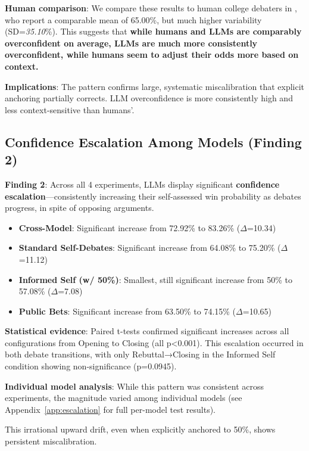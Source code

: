\documentclass{article}
\begin{document}
\textbf{Human comparison}: We compare these results to human college debaters in \citet{RePEc:sip:dpaper:06-042}, who report a comparable mean of 65.00\%, but much higher variability (SD=\textit{35.10}\%). This suggests that \textbf{while humans and LLMs are comparably overconfident on average, LLMs are much more consistently overconfident, while humans seem to adjust their odds more based on context.}

\textbf{Implications}: The pattern confirms large, systematic miscalibration that explicit anchoring partially corrects. LLM overconfidence is more consistently high and less context-sensitive than humans'.

\subsection{Confidence Escalation Among Models (Finding 2)}
\label{subsec:confidence_escalation}

\textbf{Finding 2}: Across all 4 experiments, LLMs display significant \textbf{confidence escalation}—consistently increasing their self-assessed win probability as debates progress, in spite of opposing arguments.

\begin{itemize}
    \item \textbf{Cross-Model}: Significant increase from 72.92\% to 83.26\% ($\Delta$=10.34)
    \item \textbf{Standard Self-Debates}: Significant increase from 64.08\% to 75.20\% ($\Delta$=11.12)
    \item \textbf{Informed Self (w/ 50\%)}: Smallest, still significant increase from 50\% to 57.08\% ($\Delta$=7.08)
    \item \textbf{Public Bets}: Significant increase from 63.50\% to 74.15\% ($\Delta$=10.65)
\end{itemize}

\textbf{Statistical evidence}: Paired t-tests confirmed significant increases across all configurations from Opening to Closing (all p<0.001). This escalation occurred in both debate transitions, with only Rebuttal→Closing in the Informed Self condition showing non-significance (p=0.0945).

\textbf{Individual model analysis}: While this pattern was consistent across experiments, the magnitude varied among individual models (see Appendix~\ref{app:escalation} for full per-model test results).

This irrational upward drift, even when explicitly anchored to 50\%, shows persistent miscalibration.
\end{document}
